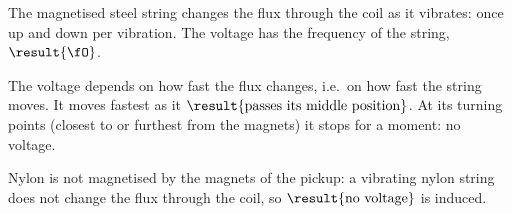 \begin{abcliste}
\abc The magnetised steel string changes the flux through the coil as it vibrates: once up and down per vibration. The voltage has the frequency of the string, $\result{\fO}$.

\abc The voltage depends on how fast the flux changes, i.e.\ on how fast the string moves. It moves fastest as it $\result{\text{passes its middle position}}$. At its turning points (closest to or furthest from the magnets) it stops for a moment: no voltage.

\abc Nylon is not magnetised by the magnets of the pickup: a vibrating nylon string does not change the flux through the coil, so $\result{\text{no voltage}}$ is induced.
\end{abcliste}
